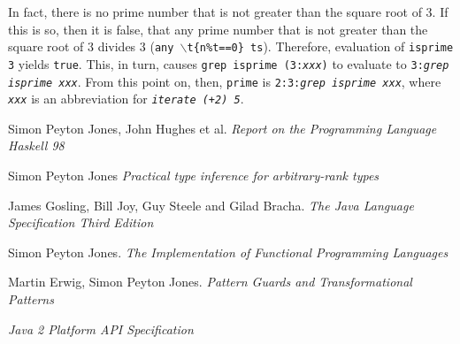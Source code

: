 \documentclass[a4paper,twocolumn,landscape]{report}
\begin{document}
In fact, there is no prime number that is not greater than the
square root of 3.
If this is so, then it is false, that any prime number that is not
greater than the square root of 3 divides 3 ({\tt any
$\backslash$t\{n\%t==0\} ts}).
Therefore, evaluation of {\tt isprime 3} yields {\tt true}.
This, in turn, causes {\tt grep isprime (3:{\it xxx})} to evaluate
to
{\tt 3:{\it grep isprime xxx}}.
From this point on, then, {\tt prime} is
{\tt 2:3:{\it grep isprime xxx}}, where {\tt\it xxx} is an abbreviation
for {\tt\it iterate (+2) 5}.



\begin{thebibliography}{99}

 Simon Peyton Jones,
John Hughes et al. \emph{Report on the Programming Language
Haskell 98}

 Simon Peyton Jones \emph{Practical type
inference for arbitrary-rank types}

 James Gosling, Bill Joy, Guy Steele and
Gilad Bracha. \emph{The Java Language Specification Third
Edition}

 Simon Peyton Jones. \emph{The Implementation of
Functional Programming Languages}

 Martin Erwig, Simon Peyton Jones. \emph{Pattern
Guards and Transformational Patterns}

 \emph{Java 2 Platform API Specification}

\end{thebibliography}


\printindex

\end{document}
